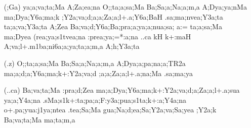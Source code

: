\begin{spacing}{1.15}
\begin{itemize}
\begin{itemize}
            \item[({\sktf ;Ga})] {\sktf ya;a;va;ta;Ma A;Za;ea;na
O;;ta;a;sa;Ma Ba;Sa;a;Na;a;m,a A;Dya;ya;nMa ma;Dya;Y6a;ma;k
;Y2a;va;d;a;a;Za;a;l+.a;Y6a;BaH .sa;ma;nvea;Y3a;ta\ZF{,} ta;a;va;Y3a;ta A;Zea Ba;va;d;Y6a;Ba;pra;a;ya;a;nua;sa;%
a:= ta;a;sa;Ma ma;Dyea (rea;ya;s1tvea;na
:prea;ya;=*:a;na ..ca kH
k+:maH A;va;l+.m1ba;ni6a;a;ya;ta;a;m,a
A;h;Y3a;ta} 
            
   \item[({\sktf .z})] {\sktf O;;ta;a;sa;Ma Ba;Sa;a;Na;a;m,a
A;Dya;a;pa;na;a;TR2a ma;a;d;a;Y6a;ma;k+:Y2a;va;d%
;a;a;Za;a;l+.a;na;Ma .sa;ma;ya}
            
   \item[({\sktf ..ca})] {\sktf Ba;va;ta;Ma :pra;d;Zea
ma;a;Dya;Y6a;ma;k+:Y2a;va;d;a;Za;a;l+.a;sua ya;a;Y4a;na
.sMa;s1k+:ta;pa;a;F:y3a;pua;s1ta;k+:a;Y4a;na
o+.pa;yua:j1ya;ntea\ZF{,} .tea;Sa;Ma gua;Na;d;ea;Sa;Y2a;va;Sa;yea ;Y2a;k Ba;va;ta;Ma ma;ta;m,a}
            \end{itemize}
\end{itemize}
\end{spacing}


